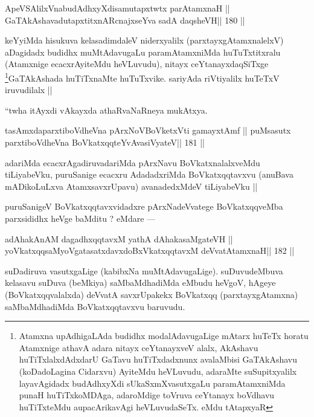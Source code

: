 \begin{shl}
ApeVSAlilxVnabudAdhxyXdisamutapxtwtx parAtamxnaH ||
GaTAkAshavadutapxtitxnARcnajxseYva sadA daqsheVH\hfill || 180 ||
\end{shl}

\begin{artha}
keYyiMda hisukuva kelasadimdaleV niderxyalilx (parxtayxgAtamxnalelxV) aDagidadx budidhx muMtAdavugaLu paramAtamxniMda huTuTxtitxralu (Atamxnige ecacxrAyiteMdu heVLuvudu), nitayx ceYtanayxdaqSiTxge \footnote[12]{Atamxna upAdhigaLAda budidhx modalAdavugaLige mAtarx huTeTx horatu Atamxnige athavA adara nitayx ceYtanayxveV alalx, AkAshavu huTiTxlalxdAdxdarU GaTavu huTiTxdadxnunx avalaMbisi GaTAkAshavu (koDadoLagina Cidarxvu) AyiteMdu heVLuvudu, adaraMte suSupitxyalilx layavAgidadx budAdhxyXdi sUkaSxmXvasutxgaLu paramAtamxniMda punaH huTiTxkoMDAga, adaroMdige toVruva ceYtanayx boVdhavu huTiTxteMdu aupacArikavAgi heVLuvudaSeTx. eMdu tAtapxyaR}GaTAkAshada huTiTxnaMte huTuTxvike. sariyAda riVtiyalilx huTeTxV iruvudilalx ||
\end{artha}

\begin{artha}
``twha itAyxdi vAkayxda athaRvaNaRneya mukAtxya.
\end{artha}

\begin{shl}
tasAmxdaparxtiboVdheVna pArxNoV\s BoVketxVti gamayxtAmf ||
puMsasutx parxtiboVdheVna BoVkatxqqteYvAvasiVyateV\hfill || 181 ||
\end{shl}

\begin{artha}
adariMda ecacxrAgadiruvadariMda pArxNavu BoVkatxnalalxveMdu tiLiyabeVku, puruSanige ecacxru AdadadxriMda BoVkatxqqtavxvu (anuBava mADikoLuLxva AtamxsavxrUpavu) avanadedxMdeV tiLiyabeVku ||
\end{artha}

\begin{artha}
puruSanigeV BoVkatxqqtavxvidadxre pArxNadeVvatege BoVkatxqqveMba parxsididhx heVge baMditu ? eMdare ---
\end{artha}

\begin{shl}
adAhakAnAM dagadhxqqtavxM yathA dAhakasaMgateVH ||
yoVkatxqqsaMyoVgatasatxdavxdoBxVkatxqqtavxM deVvatAtamxnaH\hfill || 182 ||
\end{shl}

\begin{artha}
suDadiruva vasutxgaLige (kabibxNa muMtAdavugaLige). suDuvudeMbuva kelasavu suDuva (beMkiya) saMbaMdhadiMda eMbudu heVgoV, hAgeye (BoVkatxqqvalalxda) deVvatA savxrUpakekx BoVkatxqq (parxtayxgAtamxna) saMbaMdhadiMda BoVkatxqqtavxvu baruvudu.
\end{artha}


